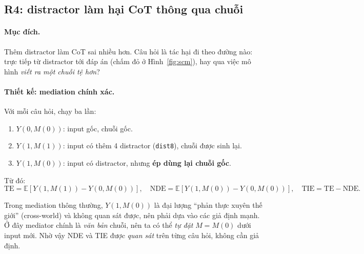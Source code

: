 \documentclass[11pt]{article}
\begin{document}
\subsection{R4: distractor làm hại CoT thông qua chuỗi}
\label{sec:r4}

\paragraph{Mục đích.} Thêm distractor làm CoT sai nhiều hơn. Câu hỏi là tác hại đi theo đường nào:
trực tiếp từ distractor tới đáp án (chấm đỏ ở Hình~\ref{fig:scm}), hay qua việc mô hình
\emph{viết ra một chuỗi tệ hơn}?

\paragraph{Thiết kế: mediation chính xác.} Với mỗi câu hỏi, chạy ba lần:
\begin{enumerate}[leftmargin=*,itemsep=1pt]
\item $Y(0,M(0))$: input gốc, chuỗi gốc.
\item $Y(1,M(1))$: input có thêm 4 distractor (\texttt{dist8}), chuỗi được sinh lại.
\item $Y(1,M(0))$: input có distractor, nhưng \textbf{ép dùng lại chuỗi gốc}.
\end{enumerate}
Từ đó:
\[
\text{TE}=\mathbb{E}[Y(1,M(1))-Y(0,M(0))],\quad
\text{NDE}=\mathbb{E}[Y(1,M(0))-Y(0,M(0))],\quad
\text{TIE}=\text{TE}-\text{NDE}.
\]

\begin{thietke}
Trong mediation thông thường, $Y(1,M(0))$ là đại lượng ``phản thực xuyên thế giới'' (cross-world)
và không quan sát được, nên phải dựa vào các giả định mạnh. Ở đây mediator chính là \emph{văn bản}
chuỗi, nên ta có thể \emph{tự đặt} $M=M(0)$ dưới input mới. Nhờ vậy NDE và TIE được \emph{quan sát}
trên từng câu hỏi, không cần giả định.
\end{thietke}
\end{document}
